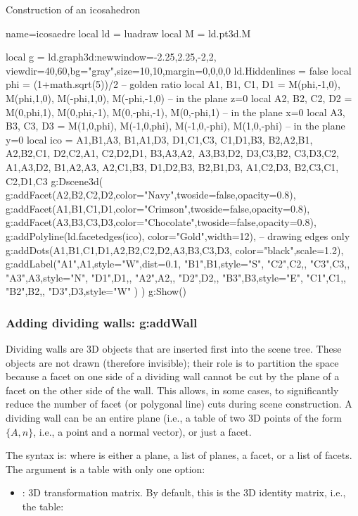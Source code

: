 \begin{demo}{Construction of an icosahedron}
\begin{luadraw}{name=icosaedre}
local ld = luadraw
local M = ld.pt3d.M

local g = ld.graph3d:new{window={-2.25,2.25,-2,2}, viewdir={40,60},bg="gray",size={10,10},margin={0,0,0,0}}
ld.Hiddenlines = false
local phi = (1+math.sqrt(5))/2 -- golden ratio
local A1, B1, C1, D1 = M(phi,-1,0), M(phi,1,0), M(-phi,1,0), M(-phi,-1,0) -- in the plane z=0
local A2, B2, C2, D2 = M(0,phi,1), M(0,phi,-1), M(0,-phi,-1), M(0,-phi,1) -- in the plane x=0
local A3, B3, C3, D3 = M(1,0,phi), M(-1,0,phi), M(-1,0,-phi), M(1,0,-phi) -- in the plane y=0
local ico = {
{A1,B1,A3}, {B1,A1,D3}, {D1,C1,C3}, {C1,D1,B3},
{B2,A2,B1}, {A2,B2,C1}, {D2,C2,A1}, {C2,D2,D1},
{B3,A3,A2}, {A3,B3,D2}, {D3,C3,B2}, {C3,D3,C2},
{A1,A3,D2}, {B1,A2,A3}, {A2,C1,B3}, {D1,D2,B3},
{B2,B1,D3}, {A1,C2,D3}, {B2,C3,C1}, {C2,D1,C3} }
g:Dscene3d(
    g:addFacet({A2,B2,C2,D2},{color="Navy",twoside=false,opacity=0.8}),
    g:addFacet({A1,B1,C1,D1},{color="Crimson",twoside=false,opacity=0.8}),
    g:addFacet({A3,B3,C3,D3},{color="Chocolate",twoside=false,opacity=0.8}),
    g:addPolyline(ld.facetedges(ico), {color="Gold",width=12}), -- drawing edges only
    g:addDots({A1,B1,C1,D1,A2,B2,C2,D2,A3,B3,C3,D3}, {color="black",scale=1.2}),
    g:addLabel("A1",A1,{style="W",dist=0.1}, "B1",B1,{style="S"}, "C2",C2,{}, "C3",C3,{},
        "A3",A3,{style="N"}, "D1",D1,{}, "A2",A2,{}, "D2",D2,{}, "B3",B3,{style="E"},
        "C1",C1,{}, "B2",B2,{}, "D3",D3,{style="W"} )
)
g:Show()
\end{luadraw}
\end{demo}

\subsubsection{Adding dividing walls: g:addWall}

Dividing walls are 3D objects that are inserted first into the scene tree. These objects are not drawn (therefore invisible); their role is to partition the space because a facet on one side of a dividing wall cannot be cut by the plane of a facet on the other side of the wall. This allows, in some cases, to significantly reduce the number of facet (or polygonal line) cuts during scene construction. A dividing wall can be an entire plane (i.e., a table of two 3D points of the form $\{A,n\}$, i.e., a point and a normal vector), or just a facet.

The syntax is:  where  is either a plane, a list of planes, a facet, or a list of facets. The  argument is a table with only one option:
\begin{itemize}
    \item {}: 3D transformation matrix. By default, this is the 3D identity matrix, i.e., the table: 
\end{itemize}


